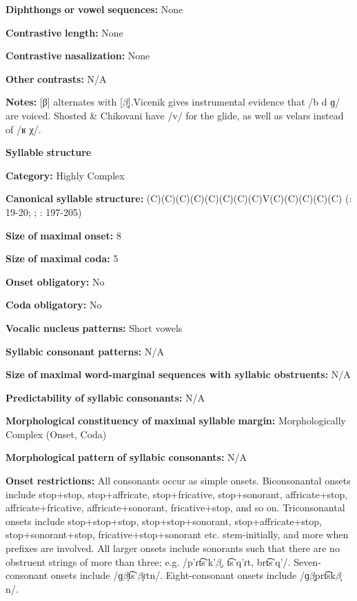 \textbf{Diphthongs} \textbf{or} \textbf{vowel} \textbf{sequences:} None

\textbf{Contrastive} \textbf{length:} None

\textbf{Contrastive} \textbf{nasalization:} None

\textbf{Other} \textbf{contrasts:} N/A

\textbf{Notes:} [β] alternates with [$\beta ̞$].Vicenik gives instrumental evidence that /b d ɡ/ are voiced. Shosted \& Chikovani have /v/ for the glide, as well as velars instead of /ʁ χ/.

\textbf{Syllable} \textbf{structure}

\textbf{Category:} Highly Complex

\textbf{Canonical} \textbf{syllable} \textbf{structure:} (C)(C)(C)(C)(C)(C)(C)(C)V(C)(C)(C)(C)(C) (\citealt{Hewitt1995}: 19-20; \citealt{Vogt1958}; \citealt{Butskhrikidze2002}: 197-205)

\textbf{Size} \textbf{of} \textbf{maximal} \textbf{onset:} 8

\textbf{Size} \textbf{of} \textbf{maximal} \textbf{coda:} 5

\textbf{Onset} \textbf{obligatory:} No

\textbf{Coda} \textbf{obligatory:} No

\textbf{Vocalic} \textbf{nucleus} \textbf{patterns:} Short vowels

\textbf{Syllabic} \textbf{consonant} \textbf{patterns:} N/A

\textbf{Size} \textbf{of} \textbf{maximal} \textbf{word{}-marginal sequences with syllabic obstruents:} N/A

\textbf{Predictability} \textbf{of} \textbf{syllabic} \textbf{consonants:} N/A

\textbf{Morphological} \textbf{constituency} \textbf{of} \textbf{maximal} \textbf{syllable} \textbf{margin:} Morphologically Complex (Onset, Coda)

\textbf{Morphological} \textbf{pattern} \textbf{of} \textbf{syllabic} \textbf{consonants:} N/A

\textbf{Onset} \textbf{restrictions:} All consonants occur as simple onsets. Biconsonantal onsets include stop+stop, stop+affricate, stop+fricative, stop+sonorant, affricate+stop, affricate+fricative, affricate+sonorant, fricative+stop, and so on. Triconsonantal onsets include stop+stop+stop, stop+stop+sonorant, stop+affricate+stop, stop+sonorant+stop, fricative+stop+sonorant etc. stem-initially, and more when prefixes are involved. All larger onsets include sonorants such that there are no obstruent strings of more than three; e.g. /p’ɾt͡s’k'$\beta ̞$, t͡s’q’ɾt, brt͡s'q{}'/. Seven-consonant onsets include /ɡ$\beta ̞$t͡s’$\beta ̞ɾ$tn/. Eight-consonant onsets include /ɡ$\beta ̞$prt͡sk$\beta ̞$n/.

